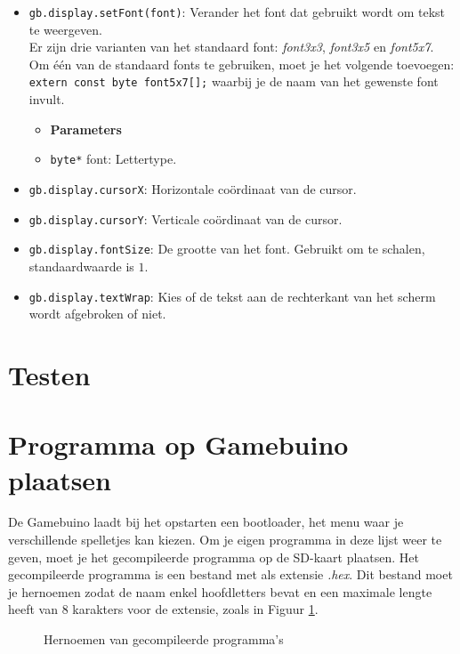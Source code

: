 \documentclass[a4paper,titlepage,12pt]{article}
\begin{document}
	\begin{itemize}
		\item \samepage \texttt{gb.display.setFont(font)}: Verander het font dat gebruikt wordt om tekst te weergeven. \\ Er zijn drie varianten van het standaard font: \emph{font3x3}, \emph{font3x5} en \emph{font5x7}. Om één van de standaard fonts te gebruiken, moet je het volgende toevoegen: \texttt{extern const byte font5x7[];} waarbij je de naam van het gewenste font invult.
		\begin{itemize}
			\item [] \textbf{Parameters}
			\item \texttt{byte*} font: Lettertype.
		\end{itemize}
	
		\item \texttt{gb.display.cursorX}: Horizontale coördinaat van de cursor.
		\item \texttt{gb.display.cursorY}: Verticale coördinaat van de cursor.
		
		\item \texttt{gb.display.fontSize}: De grootte van het font. Gebruikt om te schalen, standaardwaarde is $1$.
		
		\item \texttt{gb.display.textWrap}: Kies of de tekst aan de rechterkant van het scherm wordt afgebroken of niet.
	\end{itemize}


	\newpage
	\section{Testen}
	
	\section{Programma op Gamebuino plaatsen}
	De Gamebuino laadt bij het opstarten een bootloader, het menu waar je verschillende spelletjes kan kiezen. Om je eigen programma in deze lijst weer te geven, moet je het gecompileerde programma op de SD-kaart plaatsen. Het gecompileerde programma is een bestand met als extensie \emph{.hex}. Dit bestand moet je hernoemen zodat de naam enkel hoofdletters bevat en een maximale lengte heeft van 8 karakters voor de extensie, zoals in Figuur \ref{fig:hernoemen}.
	\begin{figure}[h]
		\centering
		\caption{\label{fig:hernoemen}Hernoemen van gecompileerde programma's}
	\end{figure}
	
\end{document}
